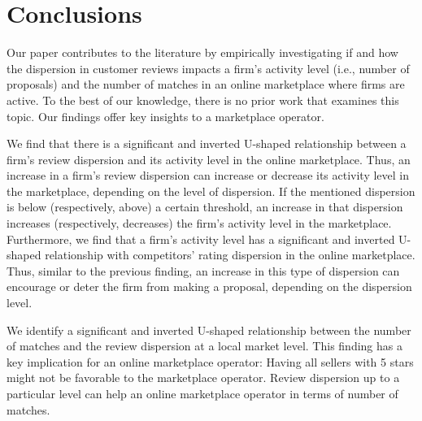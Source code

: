 \documentclass[msom,blindrev]{informs3}
\begin{document}
%


\section{Conclusions}

Our paper contributes to the literature by empirically investigating if and how the dispersion in customer reviews impacts a firm's activity level (i.e., number of proposals) and the number of matches in an online marketplace where firms are active. To the best of our knowledge, there is no prior work that examines this topic. Our findings offer key insights to a marketplace operator.

We find that there is a significant and inverted U-shaped relationship between a firm's review dispersion and its activity level in the online marketplace. Thus, an increase in a firm's review dispersion can increase or decrease its activity level in the marketplace, depending on the level of dispersion. If the mentioned dispersion is below (respectively, above) a certain threshold, an increase in that dispersion increases (respectively, decreases) the firm's activity level in the marketplace. Furthermore, we find that a firm's activity level  has a significant and inverted U-shaped relationship with competitors' rating dispersion in the online marketplace. Thus, similar to the previous finding, an increase in this type of dispersion can encourage or deter the firm from making a proposal, depending on the dispersion level.

We identify a significant and inverted U-shaped relationship between the number of matches and the review dispersion at a local market level. This finding has a key implication for an online marketplace operator: Having all sellers with 5 stars might not be favorable to the marketplace operator. Review dispersion up to a particular level can help an online marketplace operator in terms of number of matches.
\end{document}
